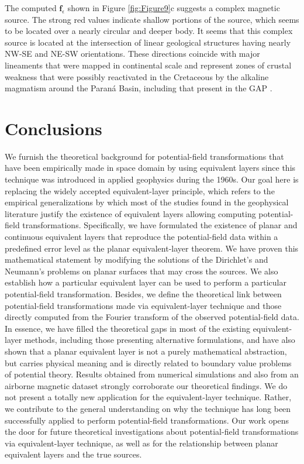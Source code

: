 \documentclass[manuscript,noblind]{geophysics}
\begin{document}
	The computed $\mathbf{f}_{\epsilon}$ shown in Figure \ref{fig:Figure9}c suggests a complex 
	magnetic source. The strong red values indicate shallow portions of the source, which 
	seems to be located over a nearly circular and deeper body. 
	It seems that this complex source is located at the intersection of linear geological 
	structures having nearly NW-SE and NE-SW orientations. 
	These directions coincide with major lineaments that were mapped in continental scale and 
	represent zones of crustal weakness that were possibly reactivated in the Cretaceous by 
	the alkaline magmatism around the Paraná Basin, including that present in the GAP 
	\citep{marangoni_mantovani_2013}.
	
	\section{Conclusions}
	\label{sec:conclusions}
	
	We furnish the theoretical background for potential-field transformations
	that have been empirically made in space domain by using equivalent layers since 
	this technique was introduced in applied geophysics during the 1960s.
	Our goal here is replacing the widely accepted equivalent-layer principle, which 
	refers to the empirical generalizations
	by which most of the studies found in the geophysical literature justify the existence of
	equivalent layers allowing computing potential-field transformations.
	Specifically, we have formulated the existence of planar and continuous equivalent layers that 
	reproduce the potential-field data within a predefined error level
	as the planar equivalent-layer theorem.
	We have proven this mathematical statement by modifying the solutions of the 
	Dirichlet's and Neumann's problems on planar surfaces that may cross the sources.
	We also establish how a particular equivalent layer can be used to perform a particular 
	potential-field transformation.
	Besides, we define the theoretical link between potential-field transformations made via 
	equivalent-layer 
	technique and those directly computed from the Fourier transform of the observed 
	potential-field data. 
	In essence, we have filled the theoretical gaps in most of the existing equivalent-layer 
	methods, including 
	those presenting alternative formulations, and have also shown 
	that a planar equivalent layer is not a purely mathematical abstraction,
	but carries physical meaning and is directly related to boundary value problems of potential 
	theory.
	Results obtained from numerical simulations and also from an airborne magnetic dataset  
	strongly corroborate our theoretical findings.
	We do not present a totally new application for the equivalent-layer technique. 
	Rather, we contribute to the general understanding on why the technique has long been 
	successfully applied to perform potential-field transformations. 
	Our work opens the door for future theoretical investigations about potential-field 
	transformations via 
	equivalent-layer technique, as well as for the relationship between planar equivalent layers 
	and the true sources.	
\end{document}
